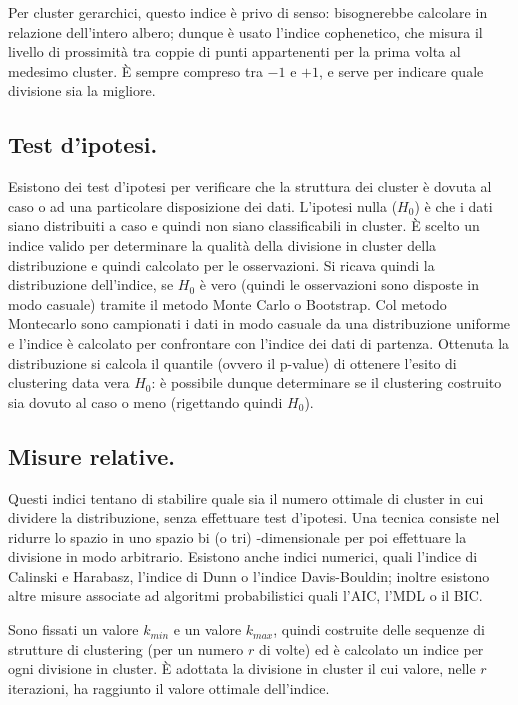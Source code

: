 \documentclass[11pt, a4page, twocolumn]{article}
\begin{document}
Per cluster gerarchici, questo indice è privo di senso: bisognerebbe calcolare in relazione dell'intero albero; dunque è usato l'indice cophenetico, che misura il livello di prossimità tra coppie di punti appartenenti per la prima volta al medesimo cluster.
È sempre compreso tra $-1$ e $+1$, e serve per indicare quale divisione sia la migliore. \newline

\subsection{Test d'ipotesi.}
Esistono dei test d'ipotesi per verificare che la struttura dei cluster è dovuta al caso o ad una particolare disposizione dei dati.
L'ipotesi nulla ($H_0$) è che i dati siano distribuiti a caso e quindi non siano classificabili in cluster.
È scelto un indice valido per determinare la qualità della divisione in cluster della distribuzione e quindi calcolato per le osservazioni.
Si ricava quindi la distribuzione dell'indice, se $H_0$ è vero (quindi le osservazioni sono disposte in modo casuale) tramite il metodo Monte Carlo o Bootstrap.
Col metodo Montecarlo sono campionati i dati in modo casuale da una distribuzione uniforme e l'indice è calcolato per confrontare con l'indice dei dati di partenza.
Ottenuta la distribuzione si calcola il quantile (ovvero il p-value) di ottenere l'esito di clustering data vera $H_0$: è possibile dunque determinare se il clustering costruito sia dovuto al caso o meno (rigettando quindi $H_0$).

\subsection{Misure relative.}
Questi indici tentano di stabilire quale sia il numero ottimale di cluster in cui dividere la distribuzione, senza effettuare test d'ipotesi.
Una tecnica consiste nel ridurre lo spazio in uno spazio bi (o tri) -dimensionale per poi effettuare la divisione in modo arbitrario.
Esistono anche indici numerici, quali l'indice di Calinski e Harabasz, l'indice di Dunn o l'indice Davis-Bouldin; inoltre esistono altre misure associate ad algoritmi probabilistici quali l'AIC, l'MDL o il BIC.

Sono fissati un valore $k_{min}$ e un valore $k_{max}$, quindi costruite delle sequenze di strutture di clustering (per un numero $r$ di volte) ed è calcolato un indice per ogni divisione in cluster.
È adottata la divisione in cluster il cui valore, nelle $r$ iterazioni, ha raggiunto il valore ottimale dell'indice.
\end{document}
